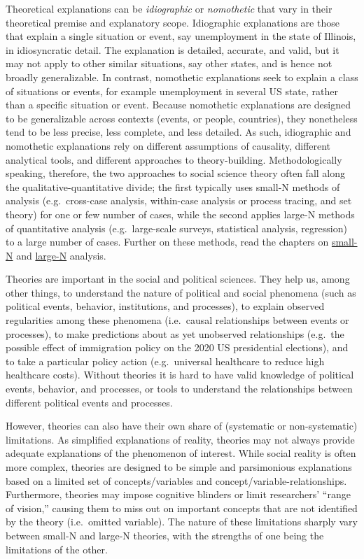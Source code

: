 \documentclass{book}
\begin{document}
Theoretical explanations can be \emph{idiographic} or \emph{nomothetic} that
vary in their theoretical premise and explanatory scope. Idiographic
explanations are those that explain a single situation or event, say
unemployment in the state of Illinois, in idiosyncratic detail. The
explanation is detailed, accurate, and valid, but it may not apply to other
similar situations, say other states, and is hence not broadly generalizable.
In contrast, nomothetic explanations seek to explain a class of situations or
events, for example unemployment in several US state, rather than a specific
situation or event. Because nomothetic explanations are designed to be
generalizable across contexts (events, or people, countries), they nonetheless
tend to be less precise, less complete, and less detailed. As such,
idiographic and nomothetic explanations rely on different assumptions of
causality, different analytical tools, and different approaches to
theory-building. Methodologically speaking, therefore, the two approaches to
social science theory often fall along the qualitative-quantitative divide;
the first typically uses small-N methods of analysis (e.g.~cross-case
analysis, within-case analysis or process tracing, and set theory) for one or
few number of cases, while the second applies large-N methods of quantitative
analysis (e.g.~large-scale surveys, statistical analysis, regression) to a
large number of cases. Further on these methods, read the chapters on
\href{/small-n.html}{small-N} and \href{/large-n.html}{large-N} analysis.

Theories are important in the social and political sciences. They help us,
among other things, to understand the nature of political and social phenomena
(such as political events, behavior, institutions, and processes), to explain
observed regularities among these phenomena (i.e.~causal relationships between
events or processes), to make predictions about as yet unobserved
relationships (e.g.~the possible effect of immigration policy on the 2020 US
presidential elections), and to take a particular policy action
(e.g.~universal healthcare to reduce high healthcare costs). Without theories
it is hard to have valid knowledge of political events, behavior, and
processes, or tools to understand the relationships between different
political events and processes.

However, theories can also have their own share of (systematic or
non-systematic) limitations. As simplified explanations of reality, theories
may not always provide adequate explanations of the phenomenon of interest.
While social reality is often more complex, theories are designed to be simple
and parsimonious explanations based on a limited set of concepts/variables and
concept/variable-relationships. Furthermore, theories may impose cognitive
blinders or limit researchers' ``range of vision,'' causing them to miss out
on important concepts that are not identified by the theory (i.e.~omitted
variable). The nature of these limitations sharply vary between small-N and
large-N theories, with the strengths of one being the limitations of the
other.
\end{document}
